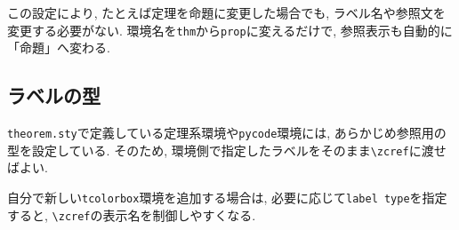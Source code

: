 \documentclass[../main.tex]{subfiles}
\begin{document}
この設定により, たとえば定理を命題に変更した場合でも, ラベル名や参照文を変更する必要がない. 
環境名を\verb|thm|から\verb|prop|に変えるだけで, 参照表示も自動的に「命題」へ変わる. 

\subsection{ラベルの型}

\texttt{theorem.sty}で定義している定理系環境や\verb|pycode|環境には, あらかじめ参照用の型を設定している. 
そのため, 環境側で指定したラベルをそのまま\verb|\zcref|に渡せばよい. 

自分で新しい\texttt{tcolorbox}環境を追加する場合は, 必要に応じて\texttt{label type}を指定すると, \verb|\zcref|の表示名を制御しやすくなる. 
\end{document}
